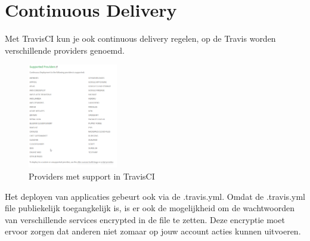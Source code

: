 \chapter{Continuous Delivery}
Met TravisCI kun je ook continuous delivery regelen, op de Travis worden verschillende providers genoemd.

\begin{figure}[H]
	\centering\includegraphics[width=0.35\textwidth]{images/TravisCICDProviders}
	\caption{Providers met support in TravisCI}
\end{figure}
Het deployen van applicaties gebeurt ook via de .travis.yml.
Omdat de .travis.yml file publiekelijk toegangkelijk is, is er ook de mogelijkheid om de wachtwoorden van verschillende services encrypted in de file te zetten.
Deze encryptie moet ervoor zorgen dat anderen niet zomaar op jouw account acties kunnen uitvoeren.
